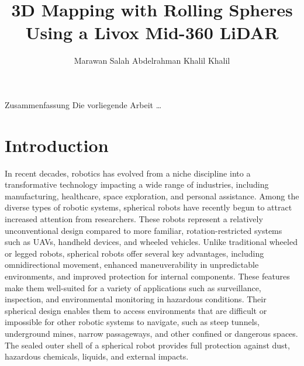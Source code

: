 \documentclass[english, bachelor, utf8]{base/thesis_telematics}
\begin{document}
\title{3D Mapping with Rolling Spheres Using a Livox Mid-360 LiDAR}
\author{Marawan Salah Abdelrahman Khalil Khalil}
\secondSupervisor{}

\generatetitle

\cleardoublepage

\begin{prefacesection}{Zusammenfassung}
Die vorliegende Arbeit \dots
\end{prefacesection}

\cleardoublepage
\tableofcontents


\startTextChapters %

\chapter{Introduction}
\label{ch:introduction}

In recent decades, robotics has evolved from a niche discipline into a transformative technology impacting a wide range of industries, including manufacturing, healthcare, space exploration, and personal assistance. 
Among the diverse types of robotic systems, spherical robots have recently begun to attract increased attention from researchers. These robots represent a relatively unconventional design compared to more familiar, rotation-restricted systems such as UAVs, handheld devices, and wheeled vehicles. 
Unlike traditional wheeled or legged robots, spherical robots offer several key advantages, including omnidirectional movement, enhanced maneuverability in unpredictable environments, and improved protection for internal components. 
These features make them well-suited for a variety of applications such as surveillance, inspection, and environmental monitoring in hazardous conditions. 
Their spherical design enables them to access environments that are difficult or impossible for other robotic systems to navigate, such as steep tunnels, underground mines, narrow passageways, and other confined or dangerous spaces.
The sealed outer shell of a spherical robot provides full protection against dust, hazardous chemicals, liquids, and external impacts. 
\end{document}
